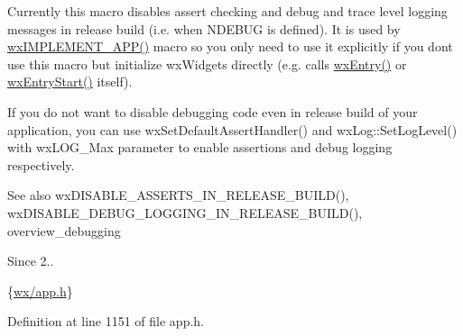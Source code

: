 Currently this macro disables assert checking and debug and trace level logging messages in release build (i.\+e. when {\ttfamily N\+D\+E\+B\+UG} is defined). It is used by \hyperlink{group__group__funcmacro__rtti_ga967aafaa261481fe2d2e1cf599e3e003}{wx\+I\+M\+P\+L\+E\+M\+E\+N\+T\+\_\+\+A\+P\+P()} macro so you only need to use it explicitly if you don\textquotesingle{}t use this macro but initialize wx\+Widgets directly (e.\+g. calls \hyperlink{group__group__funcmacro__appinitterm_ga7d3eefb35631a5d8dfce97eb17340b21}{wx\+Entry()} or \hyperlink{include_2wx_2msw_2init_8h_af30880075079ba38544854169b1af3d2}{wx\+Entry\+Start()} itself).

If you do not want to disable debugging code even in release build of your application, you can use wx\+Set\+Default\+Assert\+Handler() and wx\+Log\+::\+Set\+Log\+Level() with {\ttfamily wx\+L\+O\+G\+\_\+\+Max} parameter to enable assertions and debug logging respectively.

\begin{DoxySeeAlso}{See also}
wx\+D\+I\+S\+A\+B\+L\+E\+\_\+\+A\+S\+S\+E\+R\+T\+S\+\_\+\+I\+N\+\_\+\+R\+E\+L\+E\+A\+S\+E\+\_\+\+B\+U\+I\+L\+D(), wx\+D\+I\+S\+A\+B\+L\+E\+\_\+\+D\+E\+B\+U\+G\+\_\+\+L\+O\+G\+G\+I\+N\+G\+\_\+\+I\+N\+\_\+\+R\+E\+L\+E\+A\+S\+E\+\_\+\+B\+U\+I\+L\+D(), overview\+\_\+debugging
\end{DoxySeeAlso}
\begin{DoxySince}{Since}
2..
\end{DoxySince}
\{\hyperlink{app_8h}{wx/app.\+h}\} 

Definition at line 1151 of file app.\+h.

